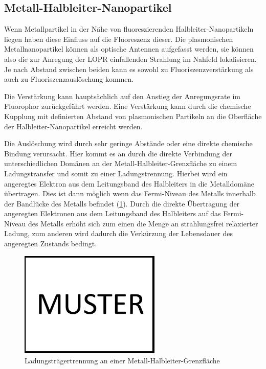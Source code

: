     \subsection{Metall-Halbleiter-Nanopartikel}
    Wenn Metallpartikel in der Nähe von fluoreszierenden Halbleiter-Nanopartikeln liegen haben diese Einfluss auf die Fluoreszenz dieser.
    Die plasmonischen Metallnanopartikel können als optische Antennen aufgefasst werden, sie können also die zur Anregung der LOPR einfallenden Strahlung im Nahfeld lokalisieren. 
    Je nach Abstand zwischen beiden kann es sowohl zu Fluoriszenzverstärkung als auch zu Fluoriszenzauslöschung kommen. \autocite{Kulakovich2002,Viste2010}
    
    Die Verstärkung kann hauptsächlich auf den Anstieg der Anregungsrate im Fluorophor zurückgeführt werden.\autocite{Chen2008}
    Eine Verstärkung kann durch die chemische Kupplung mit definierten Abstand von plasmonischen Partikeln an die Oberfläche der Halbleiter-Nanopartikel erreicht werden.\autocite{Lee2004}
    
    Die Auslöschung wird durch sehr geringe Abstände oder eine direkte chemische Bindung verursacht.\autocite{Costi2010}
    Hier kommt es an durch die direkte Verbindung der unterschiedlichen Domänen an der Metall-Halbleiter-Grenzfläche zu einem Ladungstransfer und somit zu einer Ladungstrennung.
    Hierbei wird ein angeregtes Elektron aus dem Leitungsband des Halbleiters in die Metalldomäne übertragen.
    Dies ist dann möglich wenn das Fermi-Niveau des Metalls innerhalb der Bandlücke des Metalls befindet (\cref{fig:Ladungstrennung}).
    Durch die direkte Übertragung der angeregten Elektronen aus dem Leitungsband des Halbleiters auf das Fermi-Niveau des Metalls erhöht sich zum einen die Menge an strahlungsfrei relaxierter Ladung, zum anderen wird dadurch die Verkürzung der Lebensdauer des angeregten Zustands bedingt.\autocite{Banin2014}
    
    \begin{figure}[H]
    	\centering
    	\includegraphics[width=0.6\textwidth]{Bilder/Muster} 	
    	\caption{Ladungsträgertrennung an einer Metall-Halbleiter-Grenzfläche}
    	\label{fig:Ladungstrennung}
    \end{figure}
    
